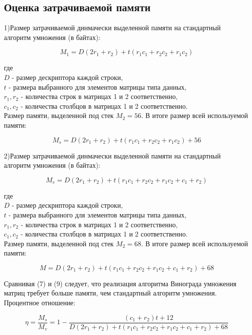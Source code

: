 \documentclass[a4paper,12pt]{article}
\begin{document}
\subsection{Оценка затрачиваемой памяти}
1)Размер затрачиваемой динмачески выделенной памяти на стандартный алгоритм умножения (в байтах):
\begin{center}
\begin{equation}
M_1 = D(2r_1 + r_2)  + t(r_1c_1 + r_2c_2 + r_1c_2)
\end{equation}
\end{center}
где \\
$D$ - размер дескриптора каждой строки,\\
$t$ - размера выбранного для элементов матрицы типа данных,\\
$r_1, r_2$ - количества строк в матрицах 1 и 2 соответственно,\\
$c_1, c_2$ - количества столбцов в матрицах 1 и 2 соответственно.\\
Размер памяти, выделенной под стек $M_2 = 56$.
В итоге размер всей используемой памяти:
\begin{center}
\begin{equation}
M_s = D(2r_1 + r_2)  + t(r_1c_1 + r_2c_2 + r_1c_2) + 56
\end{equation}
\end{center}
2)Размер затрачиваемой динмачески выделенной памяти на стандартный алгоритм умножения (в байтах):
\begin{center}
\begin{equation}
M_v = D(2r_1 + r_2)  + t(r_1c_1 + r_2c_2 + r_1c_2 + c_1 + r_2)
\end{equation}
\end{center}
где \\
$D$ - размер дескриптора каждой строки,\\
$t$ - размера выбранного для элементов матрицы типа данных,\\
$r_1, r_2$ - количества строк в матрицах 1 и 2 соответственно,\\
$c_1, c_2$ - количества столбцов в матрицах 1 и 2 соответственно.\\
Размер памяти, выделенной под стек $M_2 = 68$.
В итоге размер всей используемой памяти:
\begin{center}
\begin{equation}
M = D(2r_1 + r_2)  + t(r_1c_1 + r_2c_2 + r_1c_2 + c_1 + r_2) + 68
\end{equation}
\end{center}
Сравнивая (7) и (9) следует, что реализация алгоритма Винограда умножения матриц требует больше памяти, чем стандартный алгоритм умножения. \\
Процентное отношение:\\
\begin{center}
\begin{equation}
\eta = \frac{M_s}{M_v} = 1 - \frac{(c_1 + r_2)t + 12}{D(2r_1 + r_2)  + t(r_1c_1 + r_2c_2 + r_1c_2 + c_1 + r_2) + 68}
\end{equation}
\end{center}
\end{document}
